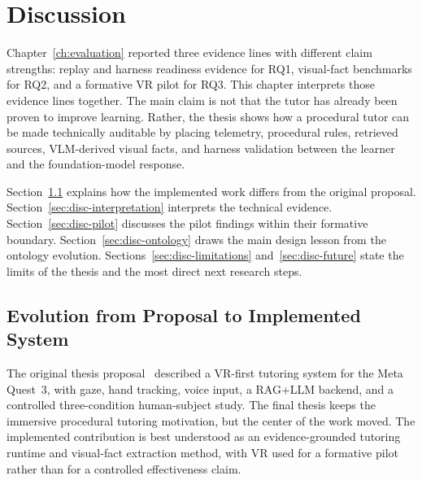 %
\chapter{Discussion}\label{ch:discussion}

Chapter~\ref{ch:evaluation} reported three evidence lines with different claim
strengths: replay and harness readiness evidence for RQ1, visual-fact
benchmarks for RQ2, and a formative VR pilot for RQ3. This chapter interprets
those evidence lines together. The main claim is not that the tutor has already
been proven to improve learning. Rather, the thesis shows how a procedural
tutor can be made technically auditable by placing telemetry, procedural rules,
retrieved sources, VLM-derived visual facts, and harness validation between the
learner and the foundation-model response.

Section~\ref{sec:disc-evolution} explains how the implemented work differs from
the original proposal. Section~\ref{sec:disc-interpretation} interprets the
technical evidence. Section~\ref{sec:disc-pilot} discusses the pilot findings
within their formative boundary. Section~\ref{sec:disc-ontology} draws the main
design lesson from the ontology evolution. Sections~\ref{sec:disc-limitations}
and~\ref{sec:disc-future} state the limits of the thesis and the most direct
next research steps.

\section{Evolution from Proposal to Implemented System}\label{sec:disc-evolution}

The original thesis proposal~\citep{ThesisProposal1128} described a VR-first
tutoring system for the Meta Quest~3, with gaze, hand tracking, voice input, a
RAG+LLM backend, and a controlled three-condition human-subject study. The final
thesis keeps the immersive procedural tutoring motivation, but the center of the
work moved. The implemented contribution is best understood as an
evidence-grounded tutoring runtime and visual-fact extraction method, with VR
used for a formative pilot rather than for a controlled effectiveness claim.

